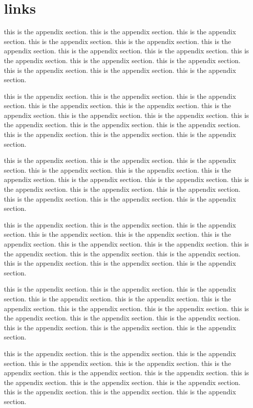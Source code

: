 \section{links}

this is the appendix section. this is the appendix section. this is the appendix section. this is the appendix section. this is the appendix section. this is the appendix section. this is the appendix section. this is the appendix section. this is the appendix section. this is the appendix section. this is the appendix section. this is the appendix section. this is the appendix section. this is the appendix section.

this is the appendix section. this is the appendix section. this is the appendix section. this is the appendix section. this is the appendix section. this is the appendix section. this is the appendix section. this is the appendix section. this is the appendix section. this is the appendix section. this is the appendix section. this is the appendix section. this is the appendix section. this is the appendix section.

this is the appendix section. this is the appendix section. this is the appendix section. this is the appendix section. this is the appendix section. this is the appendix section. this is the appendix section. this is the appendix section. this is the appendix section. this is the appendix section. this is the appendix section. this is the appendix section. this is the appendix section. this is the appendix section.

this is the appendix section. this is the appendix section. this is the appendix section. this is the appendix section. this is the appendix section. this is the appendix section. this is the appendix section. this is the appendix section. this is the appendix section. this is the appendix section. this is the appendix section. this is the appendix section. this is the appendix section. this is the appendix section.

this is the appendix section. this is the appendix section. this is the appendix section. this is the appendix section. this is the appendix section. this is the appendix section. this is the appendix section. this is the appendix section. this is the appendix section. this is the appendix section. this is the appendix section. this is the appendix section. this is the appendix section. this is the appendix section.

this is the appendix section. this is the appendix section. this is the appendix section. this is the appendix section. this is the appendix section. this is the appendix section. this is the appendix section. this is the appendix section. this is the appendix section. this is the appendix section. this is the appendix section. this is the appendix section. this is the appendix section. this is the appendix section.

